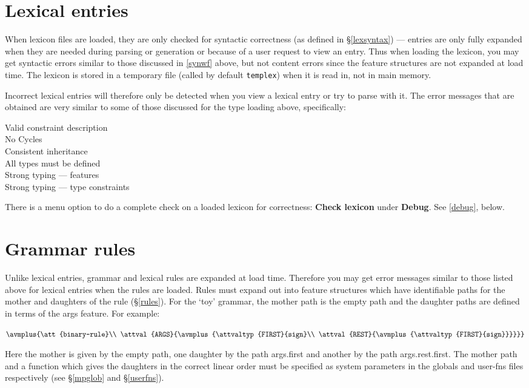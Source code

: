 \documentclass[12pt]{report}
\newcommand{\filename}[1]{{\tt #1}}
\newcommand{\lkbmenucommand}{\bf}
\begin{document}
\section{Lexical entries}

When lexicon files are loaded, they are only checked for syntactic correctness 
(as defined in \S\ref{lexsyntax})
--- entries are only fully expanded when they are needed
during parsing or generation
or because of a user request to view an entry.  Thus when loading
the lexicon, you may get syntactic errors similar to those discussed
in \ref{synwf} above, but not content errors since
the feature structures are not expanded
at load time. 
The lexicon is
stored in a temporary file (called by default \filename{templex}) when it
is read in, not in main memory.  

Incorrect lexical entries will therefore only be detected when you view a 
lexical entry or try to parse with it.  The error messages
that are obtained are very similar to some of those discussed for the
type loading above, specifically: 
\begin{description}
\item[Valid constraint description] 
\item[No Cycles]
\item[Consistent inheritance]
\item[All types must be defined]
\item[Strong typing --- features]
\item[Strong typing --- type constraints]
\end{description}

There is a menu option to 
do a complete check on a loaded lexicon for correctness:
{\lkbmenucommand Check lexicon} under {\lkbmenucommand Debug}.  See \ref{debug}, below.

\section{Grammar rules}

Unlike lexical entries, grammar and lexical rules are expanded at load time.
Therefore you may get error messages similar to those listed
above for lexical entries when the rules are loaded.
Rules must expand out into feature structures which have identifiable paths
for the mother and daughters of the rule (\S\ref{rules}).  For the `toy'
grammar, the mother path is the empty path and the daughter
paths are defined in terms of the {\feature args} feature.  For example:
\begin{center}
{\tiny
   $\avmplus{\att{binary-rule}\\
             \attval{ARGS}{\avmplus{\attvaltyp{FIRST}{sign}\\
                                    \attval{REST}{\avmplus{\attvaltyp{FIRST}{sign}}}}}}$}
\end{center}
Here the mother is given by the empty path, one daughter 
by the path {\feature args}.{\feature first} and another by the path
{\feature args}.{\feature rest}.{\feature first}.  
The mother path and a function which gives the
daughters in the correct linear order must be specified as system parameters
in the globals and user-fns files respectively (see \S\ref{mpglob} and
\S\ref{userfns}).
\end{document}
